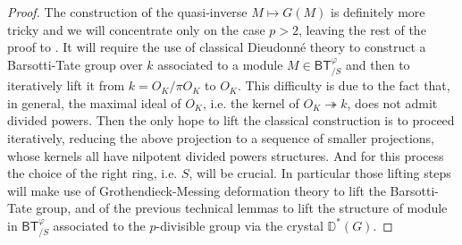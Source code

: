 \begin{proof}
The construction of the quasi-inverse $M \mapsto G(M)$
is definitely more tricky and we will concentrate only on
the case $p > 2$, leaving the rest of the proof to \cite{Kisin}.
It will require the use of classical Dieudonné theory to construct a
Barsotti-Tate group over $k$ associated to a module $M \in \mathsf{BT}^{\varphi}_{/S}$
and then to iteratively lift it from $k = O_K/\pi O_K$ to $O_K$.
This difficulty is due to the fact that, in general, the maximal
ideal of $O_K$, i.e. the kernel of $O_K \twoheadrightarrow k$, 
does not admit divided powers.
Then the only hope to lift the classical construction is to
proceed iteratively, reducing the above projection to a sequence of
smaller projections, whose kernels all have nilpotent divided powers structures.
And for this process the choice of the right ring, i.e$.$ $S$, will be crucial.
In particular those lifting steps will make use of Grothendieck-Messing
deformation theory to lift the Barsotti-Tate group, and of the previous
technical lemmas to lift the structure of module in $\mathsf{BT}^{\varphi}_{/S}$
associated to the $p$-divisible group via the crystal $\mathbb{D}^*(G)$.



\end{proof}
